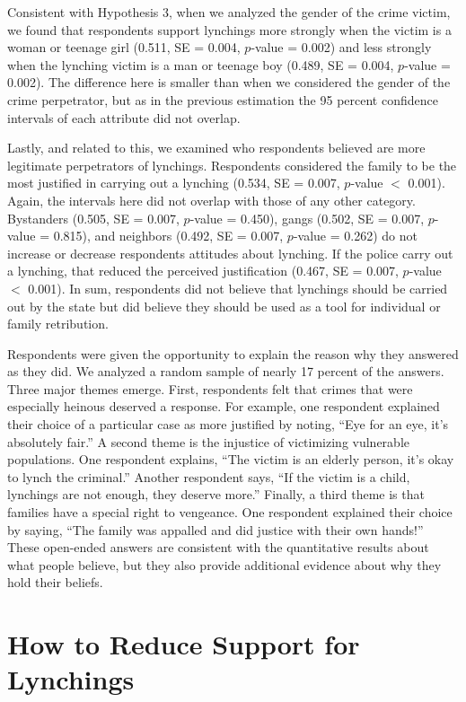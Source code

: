\documentclass[12pt,ansiapaper]{article}
\begin{document}
Consistent with Hypothesis 3, when we analyzed the gender of the crime victim, we found that respondents support lynchings more strongly when the victim is a woman or teenage girl (0.511, SE = 0.004, $p$-value = 0.002) and less strongly when the lynching victim is a man or teenage boy (0.489, SE = 0.004, $p$-value = 0.002). The difference here is smaller than when we considered the gender of the crime perpetrator, but as in the previous estimation the 95 percent confidence intervals of each attribute did not overlap. 

Lastly, and related to this, we examined who respondents believed are more legitimate perpetrators of lynchings. Respondents considered the family to be the most justified in carrying out a lynching (0.534, SE = 0.007, $p$-value $<$ 0.001). Again, the intervals here did not overlap with those of any other category. Bystanders (0.505, SE = 0.007, $p$-value = 0.450), gangs (0.502, SE = 0.007, $p$-value = 0.815), and neighbors (0.492, SE = 0.007, $p$-value = 0.262) do not increase or decrease respondents attitudes about lynching. If the police carry out a lynching, that reduced the perceived justification (0.467, SE = 0.007, $p$-value $<$ 0.001). In sum, respondents did not believe that lynchings should be carried out by the state but did believe they should be used as a tool for individual or family retribution.

Respondents were given the opportunity to explain the reason why they answered as they did. We analyzed a random sample of nearly 17 percent of the answers. Three major themes emerge. First, respondents felt that crimes that were especially heinous deserved a response. For example, one respondent explained their choice of a particular case as more justified by noting, ``Eye for an eye, it's absolutely fair.'' A second  theme is the injustice of victimizing vulnerable populations. One respondent explains, ``The victim is an elderly person, it's okay to lynch the criminal.'' Another respondent says, ``If the victim is a child, lynchings are not enough, they deserve more.'' Finally, a third theme is that families have a special right to vengeance. One respondent explained their choice by saying, ``The family was appalled and did justice with their own hands!'' These open-ended answers are consistent with the quantitative results about what people believe, but they also provide additional evidence about why they hold their beliefs. 

\section{How to Reduce Support for Lynchings}
\label{sec:exp03}
\end{document}
